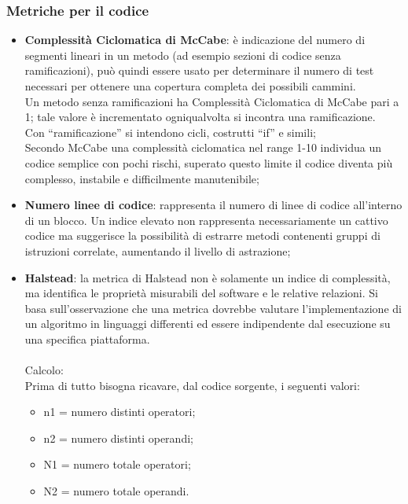 {\subsubsection{Metriche per il codice}{
	\begin{itemize}
		\item \textbf{Complessità Ciclomatica di McCabe}: è indicazione del numero di segmenti lineari in un metodo (ad esempio sezioni di codice senza ramificazioni), può quindi essere usato per determinare il numero di test necessari per ottenere una copertura completa dei possibili cammini.  \\
		Un metodo senza ramificazioni ha Complessità Ciclomatica di McCabe pari a 1; tale valore è incrementato ogniqualvolta si incontra una ramificazione.  \\
		Con “ramificazione” si intendono cicli, costrutti “if” e simili;\\
		Secondo McCabe una complessità ciclomatica nel range 1-10 individua un codice semplice con pochi rischi, superato questo limite il codice diventa più complesso, instabile e difficilmente manutenibile;
		
		\item \textbf{Numero linee di codice}: rappresenta il numero di linee di codice all'interno di un blocco. 
		Un indice elevato non rappresenta necessariamente un cattivo codice ma suggerisce la possibilità di estrarre metodi contenenti gruppi di istruzioni correlate, aumentando il livello di astrazione;
		
		\item \textbf{Halstead}: la metrica di Halstead non è solamente un indice di complessità, ma identifica le proprietà misurabili del software e le relative relazioni. Si basa sull’osservazione che una metrica dovrebbe	valutare l’implementazione di un algoritmo in linguaggi differenti ed essere indipendente dal esecuzione su una specifica piattaforma.\\\\
		Calcolo:\\
		Prima di tutto bisogna ricavare, dal codice sorgente, i seguenti valori:
		\begin{itemize}		
		\item n1 = numero distinti operatori;
		\item n2 = numero distinti operandi;
		\item N1 = numero totale operatori;
		\item N2 = numero totale operandi.
		

\end{itemize}
\end{itemize}}}
